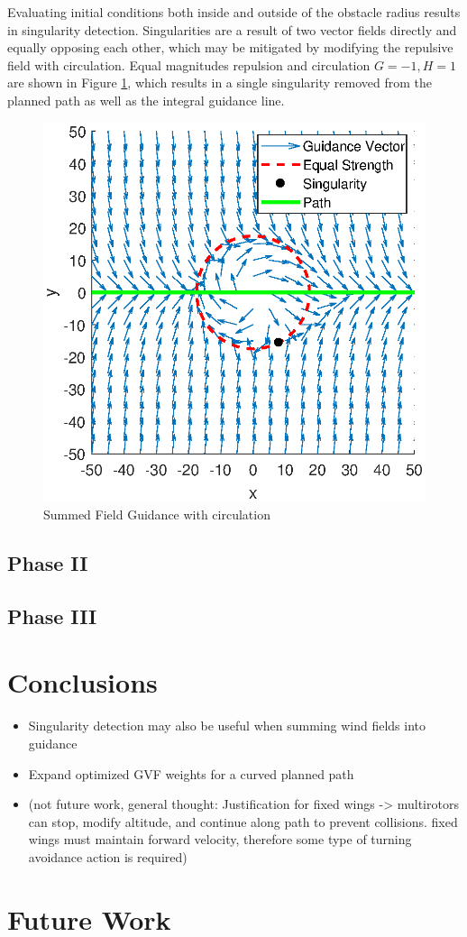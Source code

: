 \documentclass[numbered,pdftex]{ohio-etd}
\begin{document}
Evaluating initial conditions both inside and outside of the obstacle radius results in singularity detection. Singularities are a result of two vector fields directly and equally opposing each other, which may be mitigated by modifying the repulsive field with circulation. Equal magnitudes repulsion and circulation $G=-1,H=1$ are shown in Figure \ref{fig:summedGuidanceWithcirc}, which results in a single singularity removed from the planned path as well as the integral guidance line. 

\begin{figure}[H]
	\centering
	\includegraphics[trim=0 0 0 0,clip,width=14cm]{PaperFigures/Methods/summedFieldsCircSingularity}
	\caption{Summed Field Guidance with circulation}
	\label{fig:summedGuidanceWithcirc}
\end{figure}

\section{Phase II}
\section{Phase III}

\chapter{Conclusions}
\begin{itemize}
	\item Singularity detection may also be useful when summing wind fields into guidance
	\item Expand optimized GVF weights for a curved planned path
	\item (not future work, general thought: Justification for fixed wings -> multirotors can stop, modify altitude, and continue along path to prevent collisions. fixed wings must maintain forward velocity, therefore some type of turning avoidance action is required)
\end{itemize}

\chapter{Future Work}


   

\end{document}
